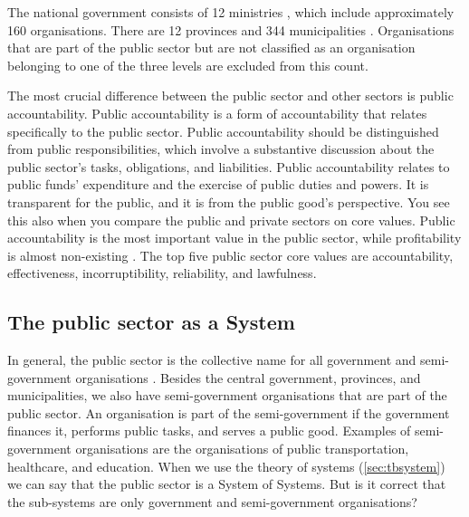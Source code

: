 The national government consists of 12 ministries \parencite{Rijksoverheid}, which include approximately 160 organisations. There are 12 provinces \parencite{Overheidsvormen} and 344 municipalities \parencite{Herindeling}. Organisations that are part of the public sector but are not classified as an organisation belonging to one of the three levels are excluded from this count. 

The most crucial difference between the public sector and other sectors is public accountability. Public accountability is a form of accountability that relates specifically to the public sector. Public accountability should be distinguished from public responsibilities, which involve a substantive discussion about the public sector's tasks, obligations, and liabilities. Public accountability relates to public funds' expenditure and the exercise of public duties and powers. It is transparent for the public, and it is from the public good's perspective. You see this also when you compare the public and private sectors on core values. Public accountability is the most important value in the public sector, while profitability is almost non-existing \parencite[p.~472]{Wal2008}. The top five public sector core values are accountability, effectiveness, incorruptibility, reliability, and lawfulness.

\subsection{The public sector as a System}
\label{sub:tbpssystemofsystems}
In general, the public sector is the collective name for all government and semi-government organisations \parencite{PrivacySense2016}. Besides the central government, provinces, and municipalities, we also have semi-government organisations that are part of the public sector. An organisation is part of the semi-government if the government finances it, performs public tasks, and serves a public good. Examples of semi-government organisations are the organisations of public transportation, healthcare, and education. When we use the theory of systems (\cref{sec:tbsystem}) we can say that the public sector is a System of Systems. But is it correct that the sub-systems are only government and semi-government organisations?

